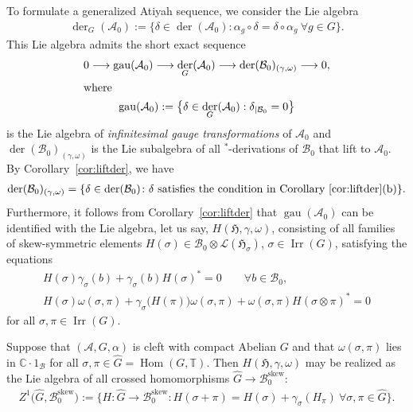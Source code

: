\documentclass[10pt,a4paper]{amsart}
\numberwithin{equation}{section}
\newcommand*{\C}{\mathbb C}		%
\newcommand*{\tensor}{\otimes}		%
\DeclareMathOperator{\der}{der}
\DeclareMathOperator{\gau}{gau}
\DeclareMathOperator{\Hom}{Hom}
\newcommand*{\Star}{$^*$\nobreakdash}
\newcommand*{\hilb}{\mathfrak}		%
\newcommand*{\alg}{\mathcal}		%
\newcommand*{\hH}{\hilb{H}}			%
\newcommand*{\one}{1}				%
\newcommand*{\aA}{\alg{A}}			%
\newcommand*{\aB}{\alg{B}} 			%
\newcommand*{\End}{\mathcal{L}} %
\DeclareMathOperator{\Irrep}{Irr} 			%
\begin{document}
To formulate a generalized Atiyah sequence, we consider the Lie algebra
\begin{gather*}
	\der_G(\aA_0) := \{ \delta \in \der(\aA_0)\colon \alpha_g \circ \delta = \delta \circ \alpha_g \ \forall g \in G \}.
\end{gather*}
This Lie algebra admits the short exact sequence
\begin{gather*}\label{eq:AtiyahNC}
	0 \longrightarrow \gau(\aA_0) \longrightarrow \der_G(\aA_0)\longrightarrow \der(\aB_0)_{(\gamma,\omega)} \longrightarrow 0,
	\\
	\shortintertext{where}
	\gau(\aA_0) := \bigl\{\delta \in \der_G(\aA_0) : \delta_{\mid \aB_0} = 0 \bigr\}
\end{gather*}
is the Lie algebra of \emph{infinitesimal gauge transformations} of $\aA_0$ and $\der(\aB_0)_{(\gamma,\omega)}$ is the Lie subalgebra of all \Star-derivations of $\aB_0$ that lift to $\aA_0$.
By Corollary~\ref{cor:liftder}, we have
\begin{gather*}
	\der(\aB_0)_{(\gamma,\omega)} = \{ \delta \in \der(\aB_0)\colon \text{$\delta$ satisfies the condition in Corollary~\ref{cor:liftder}(b)} \}.
\end{gather*}
Furthermore, it follows from Corollary~\ref{cor:liftder} that $\gau(\aA_0)$ can be identified with the Lie algebra, let us say, $H(\hH, \gamma, \omega)$, consisting of all families of skew-symmetric elements $H(\sigma) \in \aB_0 \tensor \End(\hH_\sigma)$, $\sigma \in \Irrep(G)$, satisfying the equations
\begin{gather*}%
		 H(\sigma) \gamma_\sigma(b) + \gamma_\sigma(b) H(\sigma)^* = 0
		\qquad 	\forall b \in \aB_0,\\
		 H(\sigma) \omega(\sigma,\pi) + \gamma_\sigma\big(H(\pi)\big) \omega(\sigma,\pi) + \omega(\sigma,\pi) H(\sigma \tensor \pi)^* = 0
	\end{gather*}
for all $\sigma, \pi \in \Irrep(G)$.

\begin{Remark}\label{rem:At_cleft}
Suppose that $(\aA,G,\alpha)$ is cleft with compact Abelian $G$ and that $\omega(\sigma,\pi)$ lies in $\C \cdot \one_\aB$ for all $\sigma,\pi \in \hat G = \Hom(G,\mathbb{T})$. Then $H(\hH, \gamma, \omega)$ may be realized as the Lie algebra of all crossed homomorphisms $\hat G \to \aB_0^{\text{skew}}$:
	\begin{gather*}
		Z^1\big( \hat G, \aB_0^{\text{skew}} \big) := \big\{ H\colon \hat G \to \aB_0^{\text{skew}}\colon H(\sigma+\pi) = H(\sigma) + \gamma_\sigma(H_\pi) \ \forall \sigma,\pi \in \hat G \big\}.
	\end{gather*}
\end{Remark}
\end{document}
